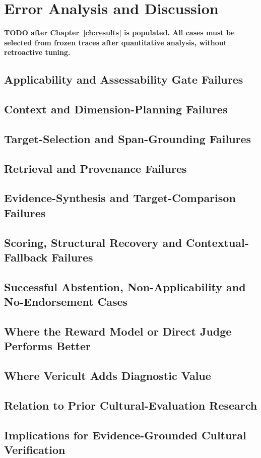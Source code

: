 \chapter{Error Analysis and Discussion}
\label{ch:discussion}

\textbf{TODO after Chapter~\ref{ch:results} is populated. All cases must be selected from frozen traces after quantitative analysis, without retroactive tuning.}

\section{Applicability and Assessability Gate Failures}
\section{Context and Dimension-Planning Failures}
\section{Target-Selection and Span-Grounding Failures}
\section{Retrieval and Provenance Failures}
\section{Evidence-Synthesis and Target-Comparison Failures}
\section{Scoring, Structural Recovery and Contextual-Fallback Failures}
\section{Successful Abstention, Non-Applicability and No-Endorsement Cases}
\section{Where the Reward Model or Direct Judge Performs Better}
\section{Where Vericult Adds Diagnostic Value}
\section{Relation to Prior Cultural-Evaluation Research}
\section{Implications for Evidence-Grounded Cultural Verification}
